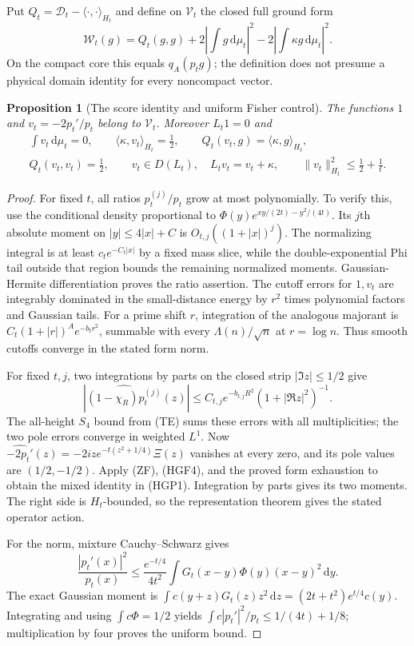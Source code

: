 \documentclass[11pt]{article}
\newtheorem{proposition}[theorem]{Proposition}
\theoremstyle{remark}\newtheorem{remark}[theorem]{Remark}
\newcommand{\dd}{\,\mathrm d}
\begin{document}
Put $Q_t=\mathcal D_t-\langle\cdot,\cdot\rangle_{H_t}$ and define
on $\mathcal V_t$ the closed full ground form
\[
 \mathcal W_t(g)=Q_t(g,g)
       +2\left|\int g\dd\mu_t\right|^2
       -2\left|\int\kappa g\dd\mu_t\right|^2 .
                                                               \tag{HGF5}
\]
On the compact core this equals $q_A(p_tg)$; the definition
does not presume a physical domain identity for every
noncompact vector.

\begin{proposition}[The score identity and uniform Fisher control]
\label{prop:heat-score}
The functions $1$ and $v_t=-2p_t'/p_t$ belong to $\mathcal V_t$.
Moreover $L_t1=0$ and
\[
\begin{gathered}
 \int v_t\dd\mu_t=0,\qquad
 \langle\kappa,v_t\rangle_{H_t}=\frac12,\qquad
 Q_t(v_t,g)=\langle\kappa,g\rangle_{H_t},\\
 Q_t(v_t,v_t)=\frac12,\qquad
 v_t\in D(L_t),\quad L_tv_t=v_t+\kappa,\qquad
 \|v_t\|_{H_t}^2\le\frac12+\frac1t .
\end{gathered}                                                \tag{HGP1}
\]
\end{proposition}
\begin{proof}
For fixed $t$, all ratios $p_t^{(j)}/p_t$ grow at most
polynomially. To verify this, use the conditional density
proportional to $\Phi(y)e^{xy/(2t)-y^2/(4t)}$.
Its $j$th absolute moment on $|y|\le4|x|+C$ is
$O_{t,j}((1+|x|)^j)$. The normalizing integral is at least
$c_te^{-C_t|x|}$ by a fixed mass slice, while the
double-exponential Phi tail outside that region bounds the
remaining normalized moments. Gaussian-Hermite
differentiation proves the ratio assertion.
The cutoff errors for $1,v_t$ are integrably dominated in
the small-distance energy by $r^2$ times polynomial factors
and Gaussian tails. For a prime shift $r$, integration of
the analogous majorant is
$C_t(1+|r|)^A e^{-b_tr^2}$, summable with every
$\Lambda(n)/\sqrt n$ at $r=\log n$.
Thus smooth cutoffs converge in the stated form norm.

For fixed $t,j$, two integrations by parts on the closed strip
$|\Im z|\le1/2$ give
\[
 \left|\widehat{(1-\chi_R)p_t^{(j)}}(z)\right|
 \le C_{t,j}e^{-b_{t,j}R^2}(1+|\Re z|^2)^{-1}.
                                                               \tag{HGP2}
\]
The all-height $S_4$ bound from (TE) sums these errors with
all multiplicities; the two pole errors converge in weighted
$L^1$. Now $\widehat{-2p_t'}(z)=-2iz e^{-t(z^2+1/4)}\Xi(z)$
vanishes at every zero, and its pole values are $(1/2,-1/2)$.
Apply (ZF), (HGF4), and the proved form exhaustion to obtain
the mixed identity in (HGP1). Integration by parts gives its
two moments. The right side is $H_t$-bounded, so the
representation theorem gives the stated operator action.

For the norm, mixture Cauchy--Schwarz gives
\[
 \frac{|p_t'(x)|^2}{p_t(x)}
 \le\frac{e^{-t/4}}{4t^2}
           \int G_t(x-y)\Phi(y)(x-y)^2\dd y.
\]
The exact Gaussian moment is
$\int c(y+z)G_t(z)z^2\dd z=(2t+t^2)e^{t/4}c(y)$.
Integrating and using $\int c\Phi=1/2$ yields
$\int c|p_t'|^2/p_t\le1/(4t)+1/8$; multiplication by four
proves the uniform bound.
\end{proof}
\end{document}
